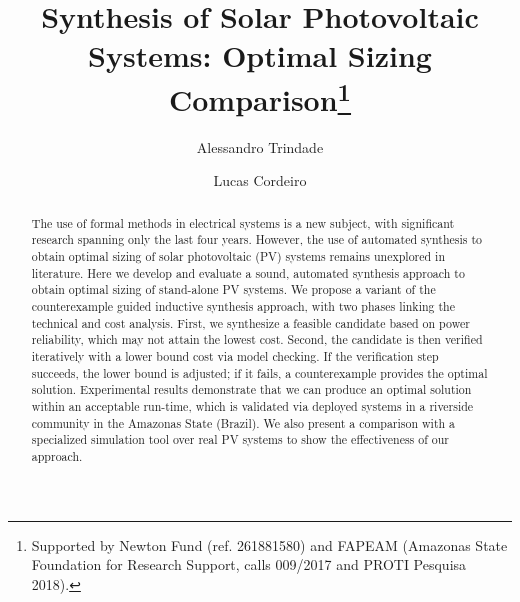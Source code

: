 \documentclass[runningheads]{llncs}
\begin{document}
%
\title{Synthesis of Solar Photovoltaic Systems: Optimal Sizing Comparison\thanks{Supported by Newton Fund (ref. 261881580) and FAPEAM (Amazonas State Foundation for Research Support, calls 009/2017 and PROTI Pesquisa 2018).}}
%
%
\author{Alessandro Trindade \and Lucas Cordeiro} %
%
%
\maketitle              %


\begin{abstract}
The use of formal methods in electrical systems is a new subject, with significant research spanning only the last four years. However, the use of automated synthesis to obtain optimal sizing of solar photovoltaic (PV) systems remains unexplored in literature. Here we develop and evaluate a sound, automated synthesis approach to obtain optimal sizing of stand-alone PV systems. We propose a variant of the counterexample guided inductive synthesis approach, with two phases linking the technical and cost analysis. First, we synthesize a feasible candidate based on power reliability, which may not attain the lowest cost. Second, the candidate is then verified iteratively with a lower bound cost via model checking. If the verification step succeeds, the lower bound is adjusted; if it fails, a counterexample provides the optimal solution. Experimental results demonstrate that we can produce an optimal solution within an acceptable run-time, which is validated via deployed systems in a riverside community in the Amazonas State (Brazil). We also present a comparison with a specialized simulation tool over real PV systems to show the effectiveness of our approach.
\end{abstract}
\end{document}
